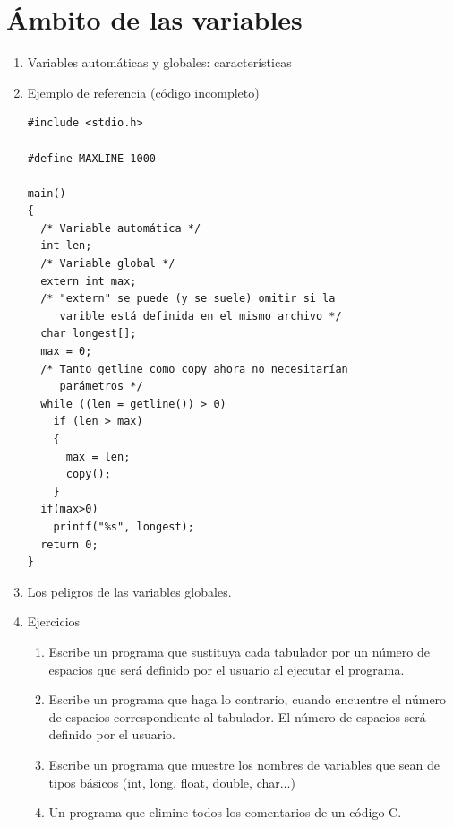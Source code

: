 \documentclass[a4paper,oneside]{article}
\begin{document}
\section{Ámbito de las variables}
  \begin{enumerate}
  \item Variables automáticas y globales: características
  \item Ejemplo de referencia (código incompleto)

    \begin{verbatim}
#include <stdio.h>

#define MAXLINE 1000

main()
{
  /* Variable automática */
  int len;
  /* Variable global */
  extern int max;
  /* "extern" se puede (y se suele) omitir si la
     varible está definida en el mismo archivo */
  char longest[];
  max = 0;
  /* Tanto getline como copy ahora no necesitarían
     parámetros */
  while ((len = getline()) > 0)
    if (len > max)
    {
      max = len;
      copy();
    }
  if(max>0)
    printf("%s", longest);
  return 0;
}
    \end{verbatim}
  \item Los peligros de las variables globales.
  \newpage
  \item Ejercicios
    \begin{enumerate}
    \item Escribe un programa que sustituya cada tabulador por un número de espacios que será definido por el usuario al ejecutar el programa.
    \item Escribe un programa que haga lo contrario, cuando encuentre el número de espacios correspondiente al tabulador. El número de espacios será definido por el usuario.
    \item Escribe un programa que muestre los nombres de variables que sean de tipos básicos (int, long, float, double, char...)
    \item Un programa que elimine todos los comentarios de un código C.
    \end{enumerate}
  \end{enumerate}
\end{document}
